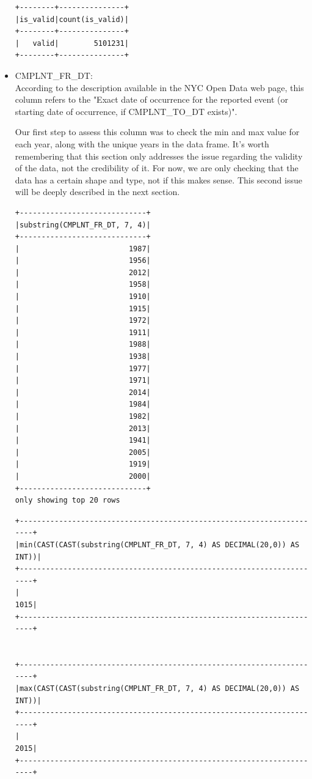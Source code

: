 \documentclass{article}
\begin{document}
\begin{itemize}
\begin{verbatim}
+--------+---------------+                                            
|is_valid|count(is_valid)|
+--------+---------------+
|   valid|        5101231|
+--------+---------------+
\end{verbatim}

\item CMPLNT\_FR\_DT: \\
According to the description available in the NYC Open Data web page, this column refers to the "Exact date of occurrence for the reported event (or starting date of occurrence, if CMPLNT\_TO\_DT exists)". 

Our first step to assess this column was to check the min and max value for each year, along with the unique years in the data frame. It's worth remembering that this section only addresses the issue regarding the validity of the data, not the credibility of it. For now, we are only checking that the data has a certain shape and type, not if this makes sense. This second issue will be deeply described in the next section.  

\begin{verbatim}
+-----------------------------+ 
|substring(CMPLNT_FR_DT, 7, 4)|
+-----------------------------+
|                         1987|
|                         1956|
|                         2012|
|                         1958|
|                         1910|
|                         1915|
|                         1972|
|                         1911|
|                         1988|
|                         1938|
|                         1977|
|                         1971|
|                         2014|
|                         1984|
|                         1982|
|                         2013|
|                         1941|
|                         2005|
|                         1919|
|                         2000|
+-----------------------------+
only showing top 20 rows
\end{verbatim}
\pagebreak
\begin{verbatim}
+----------------------------------------------------------------------+   
|min(CAST(CAST(substring(CMPLNT_FR_DT, 7, 4) AS DECIMAL(20,0)) AS INT))|
+----------------------------------------------------------------------+
|                                                                  1015|
+----------------------------------------------------------------------+


+----------------------------------------------------------------------+   
|max(CAST(CAST(substring(CMPLNT_FR_DT, 7, 4) AS DECIMAL(20,0)) AS INT))|
+----------------------------------------------------------------------+
|                                                                  2015|
+----------------------------------------------------------------------+
\end{verbatim}


\end{itemize}
\end{document}
